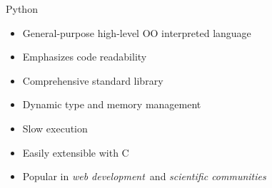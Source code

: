 \documentclass[utf8x,xcolor=pdftex,dvipsnames,table]{beamer}
\begin{document}

\begin{frame}{Python}
  \begin{itemize}
  \item General-purpose high-level OO interpreted language
  \item Emphasizes code readability
  \item Comprehensive standard library
  \item Dynamic type and memory management
  \item Slow execution
  \item Easily extensible with C
  \item Popular in {\em web development}\ and {\em scientific communities}
  \end{itemize}
\end{frame}
\end{document}
